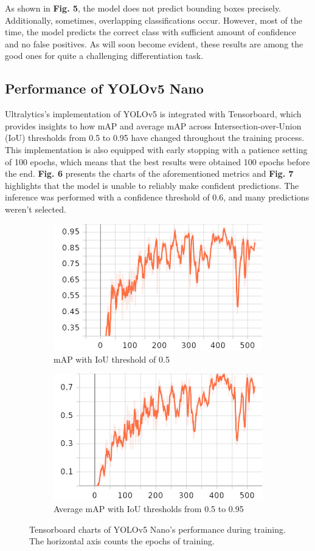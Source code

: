 \documentclass[journal,onecolumn]{IEEEtran}
\begin{document}
As shown in \textbf{Fig. 5}, the model does not predict bounding boxes precisely. Additionally, sometimes, overlapping classifications occur. However, most of the time, the model predicts the correct class with sufficient amount of confidence and no false positives. As will soon become evident, these results are among the good ones for quite a challenging differentiation task.

\subsection{Performance of YOLOv5 Nano}

Ultralytics's implementation of YOLOv5 is integrated with Tensorboard, which provides insights to how mAP and average mAP across Intersection-over-Union (IoU) thresholds from 0.5 to 0.95 have changed throughout the training process. This implementation is also equipped with early stopping with a patience setting of 100 epochs, which means that the best results were obtained 100 epochs before the end. \textbf{Fig. 6} presents the charts of the aforementioned metrics and \textbf{Fig. 7} highlights that the model is unable to reliably make confident predictions. The inference was performed with a confidence threshold of 0.6, and many predictions weren't selected.

\begin{figure}[h]
    \centering
    \begin{subfigure}[b]{\textwidth}
        \centering
        \includegraphics[width=0.475\linewidth]{figures/yolov5-map-chart.jpg}%
        \caption{mAP with IoU threshold of 0.5}
    \end{subfigure}
    \vfill
    \begin{subfigure}[b]{\textwidth}
        \centering
        \includegraphics[width=0.475\linewidth]{figures/yolov5-map-95-chart.jpg}
        \caption{Average mAP with IoU thresholds from 0.5 to 0.95}
    \end{subfigure}
    \caption{Tensorboard charts of YOLOv5 Nano's performance during training. The horizontal axis counts the epochs of training.}
\end{figure}
\end{document}
